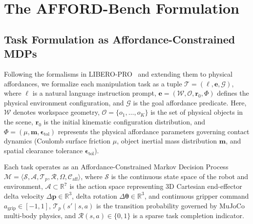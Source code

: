 \documentclass[conference]{IEEEtran}
\begin{document}
\section{The AFFORD-Bench Formulation}
\label{sec:benchmark}

\subsection{Task Formulation as Affordance-Constrained MDPs}
Following the formalisms in LIBERO-PRO~\cite{zhou2026liberopro} and extending them to physical affordances, we formalize each manipulation task as a tuple $\mathcal{T} = (\ell, \mathbf{e}, \mathcal{G})$, where $\ell$ is a natural language instruction prompt, $\mathbf{e} = (\mathcal{W}, \mathcal{O}, \mathbf{r}_0, \Phi)$ defines the physical environment configuration, and $\mathcal{G}$ is the goal affordance predicate. Here, $\mathcal{W}$ denotes workspace geometry, $\mathcal{O} = \{o_1, \dots, o_K\}$ is the set of physical objects in the scene, $\mathbf{r}_0$ is the initial kinematic configuration distribution, and $\Phi = (\mu, \mathbf{m}, \boldsymbol{\epsilon}_{\text{tol}})$ represents the physical affordance parameters governing contact dynamics (Coulomb surface friction $\mu$, object inertial mass distribution $\mathbf{m}$, and spatial clearance tolerance $\boldsymbol{\epsilon}_{\text{tol}}$).

Each task operates as an Affordance-Constrained Markov Decision Process $\mathcal{M} = \langle \mathcal{S}, \mathcal{A}, \mathcal{T}_p, \mathcal{R}, \Omega, \mathcal{C}_{\text{aff}} \rangle$, where $\mathcal{S}$ is the continuous state space of the robot and environment, $\mathcal{A} \subset \mathbb{R}^7$ is the action space representing 3D Cartesian end-effector delta velocity $\Delta \mathbf{p} \in \mathbb{R}^3$, delta rotation $\Delta \boldsymbol{\theta} \in \mathbb{R}^3$, and continuous gripper command $a_{\text{grip}} \in [-1, 1]$, $\mathcal{T}_p(s' \mid s, a)$ is the transition probability governed by MuJoCo multi-body physics, and $\mathcal{R}(s, a) \in \{0, 1\}$ is a sparse task completion indicator. 
\end{document}
